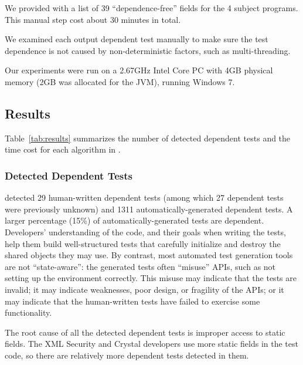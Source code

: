 We provided \ourtool with a list of 39 ``dependence-free'' fields
for the 4 subject programs. This manual step cost
about 30 minutes in total.


We examined each output dependent test manually to make
sure the test dependence is not caused by non-deter\-min\-istic
factors, such as multi-threading.

Our experiments were run on a 2.67GHz Intel Core PC
with 4GB physical memory (2GB was allocated for the JVM),
running Windows 7.

\subsection{Results}

Table~\ref{tab:results} summarizes the number of detected
dependent tests and the time cost for each algorithm
in \ourtool.

\subsubsection{Detected Dependent Tests}
\label{sec:detectedtests}


\ourtool detected 29 human-written dependent tests (among which 27
dependent tests were previously unknown) and 1311
automatically-generated dependent tests.  A larger percentage (15\%) of
automatically-generated tests are dependent.  Developers' understanding of
the code, and their goals when writing the tests, help them build
well-structured tests that carefully initialize and destroy the shared
objects they may use.
By contrast,  most automated test generation tools are not ``state-aware'': the
generated tests often ``misuse'' APIs, such as not setting up
the environment correctly.  This misuse may
indicate that the tests are invalid; it may indicate weaknesses, poor
design, or fragility of the APIs; or it may indicate that the human-written
tests have failed to exercise some functionality.

The root cause of all the detected dependent tests is improper access to
static fields. The XML Security and Crystal developers use more
static fields in the test code,
so there are relatively more dependent tests detected in them.

